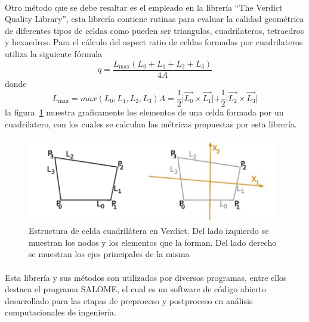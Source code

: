 \documentclass[letterpaper, openright, 12pt]{book}
\begin{document}
    \paragraph*{}
    Otro método que se debe resaltar es el empleado en la librería ``The
    Verdict Quality Library'', esta librería contiene rutinas para evaluar
    la calidad geométrica de diferentes tipos de celdas como pueden ser
    triangulos, cuadrilateros, tetraedros y hexaedros. Para el cálculo del
    aspect ratio de celdas formadas por cuadrilateros utiliza la siguiente
    fórmula
    \begin{equation}
        q = \frac{L_{\max}\left( L_0 + L_1 + L_2 + L_3 \right)}{4A}
    \end{equation}
    donde
    \begin{subequations}
        \begin{equation*}
            L_{\max} = max\left( L_0, L_1, L_2, L_3 \right)
        \end{equation*}
        \begin{equation*}
            A = \frac{1}{2} \lvert \vec{L_0} \times \vec{L_1} \lvert
                + \frac{1}{2} \lvert \vec{L_2} \times \vec{L_3} \lvert
        \end{equation*}
    \end{subequations}
    la figura~\ref{aspect_verdict} muestra graficamente los elementos de una
    celda formada por un cuadrilatero, con los cuales se calculan las métricas
    propuestas por esta librería.

        \begin{figure}[htbp!]
            \centering
            \includegraphics[keepaspectratio, width=110mm]{./Imagenes/aspect_verdict.png}
            \caption[Estrcutura celda cuadrilatera en Verdict]{Estructura de
            celda cuadrilátera en Verdict. Del lado izquierdo se muestran los
            nodos y los elementos que la forman. Del lado derecho se muestran
            los ejes principales de la misma\cite{verdict_quality}}
            \label{aspect_verdict}
        \end{figure}

    \paragraph*{}
    Esta librería y sus métodos son utilizados por diversos programas, entre
    ellos destaca el programa SALOME, el cual es un software de código
    abierto desarrollado para las etapas de preproceso y postproceso en
    análisis computacionales de ingeniería.
\end{document}
